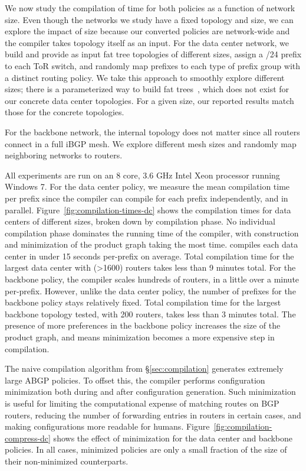 We now study the compilation of time for both policies as a function of network size. Even though the networks we study have a fixed topology and size, we can explore the impact of size because our converted policies are network-wide and the compiler takes topology itself as an input. For the data center network, we build and provide as input fat tree topologies of different sizes, assign a /24 prefix to each ToR switch, and randomly map prefixes to each type of prefix group with a distinct routing policy. We take this approach to smoothly explore different sizes; there is a parameterized way to build fat trees~\cite{fattree}, which does not exist for our concrete data center topologies. For a given size, our reported results match those for the concrete topologies.

For the backbone network, the internal topology does not matter since all routers connect in a full iBGP mesh. We explore different mesh sizes and randomly map neighboring networks to routers.

All experiments are run on an 8 core, 3.6 GHz Intel Xeon processor running Windows 7.
%
For the data center policy, we measure the mean compilation time per prefix since the \sysname compiler can compile for each prefix independently, and in parallel. Figure~\ref{fig:compilation-times-dc} shows the compilation times for data centers of different sizes, broken down by compilation phase. No individual compilation phase dominates the running time of the compiler, with construction and minimization of the product graph taking the most time. \sysname compiles each data center in under 15 seconds per-prefix on average. Total compilation time for the largest data center with (>1600) routers takes less than 9 minutes total.
%
For the backbone policy, the \sysname compiler scales hundreds of routers, in a little over a minute per-prefix. However, unlike the data center policy, the number of prefixes for the backbone policy stays relatively fixed. Total compilation time for the largest backbone topology tested, with 200 routers, takes less than 3 minutes total. The presence of more preferences in the backbone policy increases the size of the product graph, and means minimization becomes a more expensive step in compilation. 

The naive compilation algorithm from \S\ref{sec:compilation} generates extremely large ABGP policies. To offset this, the compiler performs configuration minimization both during and after configuration generation. Such minimization is useful for limiting the computational expense of matching routes on BGP routers, reducing the number of forwarding entries in routers in certain cases, and making configurations more readable for humans. Figure~\ref{fig:compilation-compress-dc} shows the effect of minimization for the data center and backbone policies. In all cases, minimized policies are only a small fraction of the size of their non-minimized counterparts.


